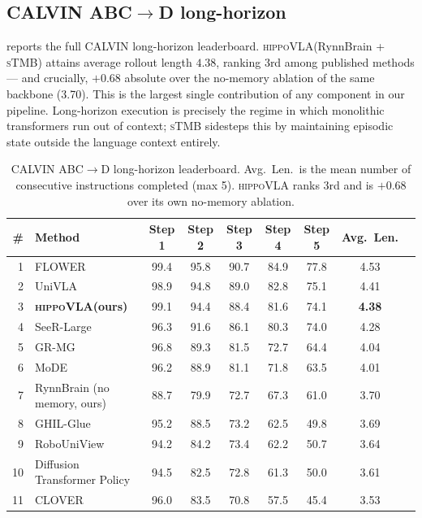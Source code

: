 \documentclass[10pt,letterpaper]{article}
\newcommand{\method}{\textsc{hippoVLA}\xspace}
\newcommand{\sTMB}{\textsc{sTMB}\xspace}
\begin{document}
\subsection{CALVIN ABC$\rightarrow$D long-horizon}
\label{sec:exp-calvin}
 reports the full CALVIN long-horizon leaderboard. \method (RynnBrain + \sTMB) attains average rollout length $4.38$, ranking 3rd among published methods --- and crucially, $+0.68$ absolute over the no-memory ablation of the same backbone (3.70). This is the largest single contribution of any component in our pipeline. Long-horizon execution is precisely the regime in which monolithic transformers run out of context; \sTMB sidesteps this by maintaining episodic state outside the language context entirely.

\begin{table}[t]
\centering
\small
\caption{CALVIN ABC$\rightarrow$D long-horizon leaderboard. Avg.\ Len.\ is the mean number of consecutive instructions completed (max 5). \method ranks 3rd and is $+0.68$ over its own no-memory ablation.}
\label{tab:calvin}
\begin{tabular}{rlcccccc c}
\toprule
\# & Method & Step 1 & Step 2 & Step 3 & Step 4 & Step 5 & Avg.\ Len. \\
\midrule
1 & FLOWER                          & 99.4 & 95.8 & 90.7 & 84.9 & 77.8 & 4.53 \\
2 & UniVLA                          & 98.9 & 94.8 & 89.0 & 82.8 & 75.1 & 4.41 \\
3 & \textbf{\method (ours)}         & 99.1 & 94.4 & 88.4 & 81.6 & 74.1 & \textbf{4.38} \\
4 & SeeR-Large                      & 96.3 & 91.6 & 86.1 & 80.3 & 74.0 & 4.28 \\
5 & GR-MG                           & 96.8 & 89.3 & 81.5 & 72.7 & 64.4 & 4.04 \\
6 & MoDE                            & 96.2 & 88.9 & 81.1 & 71.8 & 63.5 & 4.01 \\
7 & RynnBrain (no memory, ours)     & 88.7 & 79.9 & 72.7 & 67.3 & 61.0 & 3.70 \\
8 & GHIL-Glue                       & 95.2 & 88.5 & 73.2 & 62.5 & 49.8 & 3.69 \\
9 & RoboUniView                     & 94.2 & 84.2 & 73.4 & 62.2 & 50.7 & 3.64 \\
10 & Diffusion Transformer Policy   & 94.5 & 82.5 & 72.8 & 61.3 & 50.0 & 3.61 \\
11 & CLOVER                         & 96.0 & 83.5 & 70.8 & 57.5 & 45.4 & 3.53 \\

\end{tabular}
\end{table}
\end{document}
